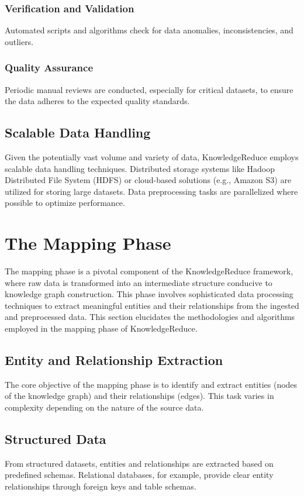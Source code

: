 \documentclass{article}
\begin{document}
\subsubsection{Verification and Validation} 
Automated scripts and algorithms check for data anomalies, inconsistencies, and outliers.
\subsubsection{Quality Assurance} 
Periodic manual reviews are conducted, especially for critical datasets, to ensure the data adheres to the expected quality standards.
\subsection{Scalable Data Handling}
Given the potentially vast volume and variety of data, KnowledgeReduce employs scalable data handling techniques. Distributed storage systems like Hadoop Distributed File System (HDFS) or cloud-based solutions (e.g., Amazon S3) are utilized for storing large datasets. Data preprocessing tasks are parallelized where possible to optimize performance.
\section{The Mapping Phase}
The mapping phase is a pivotal component of the KnowledgeReduce framework, where raw data is transformed into an intermediate structure conducive to knowledge graph construction. This phase involves sophisticated data processing techniques to extract meaningful entities and their relationships from the ingested and preprocessed data. This section elucidates the methodologies and algorithms employed in the mapping phase of KnowledgeReduce.

\subsection{Entity and Relationship Extraction}
The core objective of the mapping phase is to identify and extract entities (nodes of the knowledge graph) and their relationships (edges). This task varies in complexity depending on the nature of the source data.

\subsection{Structured Data}
From structured datasets, entities and relationships are extracted based on predefined schemas. Relational databases, for example, provide clear entity relationships through foreign keys and table schemas.
\end{document}
